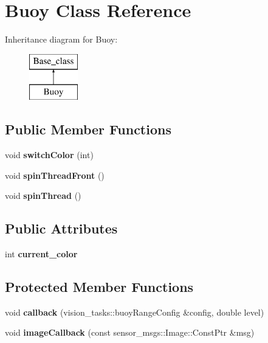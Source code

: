 \hypertarget{classBuoy}{}\section{Buoy Class Reference}
\label{classBuoy}
Inheritance diagram for Buoy\+:\begin{figure}[H]
\begin{center}
\leavevmode
\includegraphics[height=2.000000cm]{classBuoy}
\end{center}
\end{figure}
\subsection*{Public Member Functions}
\begin{DoxyCompactItemize}
\item 
\mbox{\label{classBuoy_aae6a7d935b45ae2d5aa10aa80d46e0d7}} 
void {\bfseries switch\+Color} (int)
\item 
\mbox{\label{classBuoy_ae24b8d548c1f922122020c23d53c190b}} 
void {\bfseries spin\+Thread\+Front} ()
\item 
\mbox{\label{classBuoy_a787135abf00b8fff3e3cf96ccc9ba0ec}} 
void {\bfseries spin\+Thread} ()
\end{DoxyCompactItemize}
\subsection*{Public Attributes}
\begin{DoxyCompactItemize}
\item 
\mbox{\label{classBuoy_a52630f83ade22809208e0050fd189bb0}} 
int {\bfseries current\+\_\+color}
\end{DoxyCompactItemize}
\subsection*{Protected Member Functions}
\begin{DoxyCompactItemize}
\item 
\mbox{\label{classBuoy_a7dde14ad16d6eae2612687a41d8a466c}} 
void {\bfseries callback} (vision\+\_\+tasks\+::buoy\+Range\+Config \&config, double level)
\item 
\mbox{\label{classBuoy_add99f142a60bce53abe8cb6c6e224933}} 
void {\bfseries image\+Callback} (const sensor\+\_\+msgs\+::\+Image\+::\+Const\+Ptr \&msg)
\end{DoxyCompactItemize}
